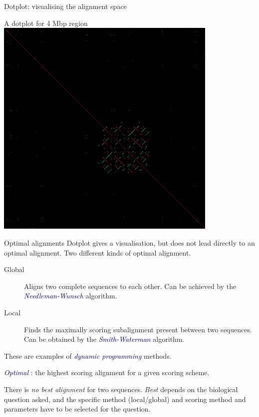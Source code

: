 \documentclass[pdf]{beamer}
\begin{document}
\begin{frame}{Dotplot: visualising the alignment space}
  \begin{figure}[ht]
    \begin{tikzpicture}[scale=0.5]
      
    \end{tikzpicture}
  \end{figure}

\end{frame}

\begin{frame}{A dotplot for 4 Mbp region}
  \flushleft
    \includegraphics[width=0.8\textwidth]{images/mega_dotter_4_044000001.jpg}
    \hfill
\end{frame}

\begin{frame}{Optimal alignments}
  Dotplot gives a visualisation, but does not lead directly to
  an optimal alignment. Two different kinds of optimal alignment.
  \begin{description}
  \item[Global] Aligns two complete sequences to each other. Can
    be achieved by the \textcolor{navy}{\emph{Needleman-Wunsch}} algorithm.
  \item[Local] Finds the maximally scoring subalignment present
    between two sequences. Can be obtained by the \textcolor{navy}{\emph{Smith-Waterman}}
    algorithm.
  \end{description}
  \pause
  These are examples of \textcolor{navy}{\emph{dynamic programming}} methods.

  \textcolor{navy}{\emph{Optimal}} : the highest scoring alignment for a given scoring scheme.

  There is \emph{no best alignment} for two sequences. \emph{Best} depends on
  the biological question asked, and the specific method (local/global) and
  scoring method and parameters have to be selected for the question.
\end{frame}
\end{document}
